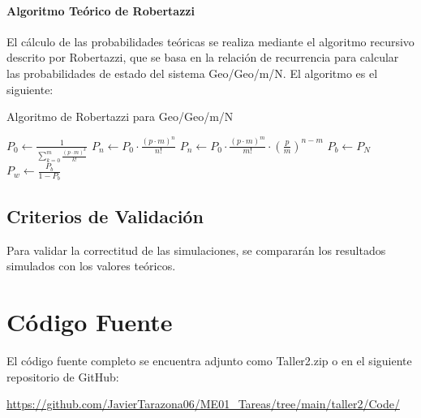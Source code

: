 \documentclass{article}
\begin{document}
\paragraph{Algoritmo Teórico de Robertazzi}

El cálculo de las probabilidades teóricas se realiza mediante el algoritmo recursivo descrito por Robertazzi, que se basa en la relación de recurrencia para calcular las probabilidades de estado del sistema Geo/Geo/m/N. El algoritmo es el siguiente:

\begin{algorithm}[H]
\caption{Algoritmo de Robertazzi para Geo/Geo/m/N}
\begin{algorithmic}[1]
\STATE $P_0 \leftarrow \frac{1}{\sum_{k=0}^{m} \frac{(p \cdot m)^k}{k!}}$ 
        \STATE $P_n \leftarrow P_0 \cdot \frac{(p \cdot m)^n}{n!}$
    \ELSE
        \STATE $P_n \leftarrow P_0 \cdot \frac{(p \cdot m)^m}{m!} \cdot \left(\frac{p}{m}\right)^{n-m}$
    \ENDIF
\ENDFOR
\STATE $P_b \leftarrow P_N$ 
\STATE $P_w \leftarrow \frac{P_b}{1 - P_b}$ 
\end{algorithmic}
\end{algorithm}

\subsection{Criterios de Validación}

Para validar la correctitud de las simulaciones, se compararán los resultados simulados con los valores teóricos.



\section{Código Fuente}\label{sec:cod}

El código fuente completo se encuentra adjunto como Taller2.zip
o en el siguiente repositorio de GitHub:

\begin{center}
\url{https://github.com/JavierTarazona06/ME01_Tareas/tree/main/taller2/Code/}
\end{center}
\end{document}
